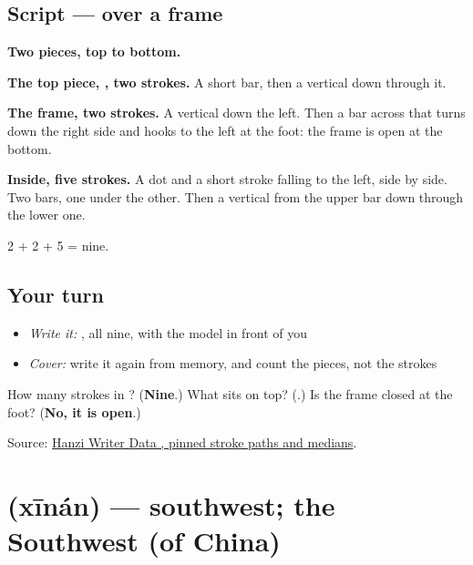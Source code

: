 \subsection*{Script —  over a frame}

\begin{quote}
\end{quote}

\textbf{Two pieces, top to bottom.}

\textbf{The top piece, , two strokes.} A short bar, then a vertical down through it.

\textbf{The frame, two strokes.} A vertical down the left. Then a bar across that turns down the right side and hooks to the left at the foot: the frame is open at the bottom.

\textbf{Inside, five strokes.} A dot and a short stroke falling to the left, side by side. Two bars, one under the other. Then a vertical from the upper bar down through the lower one.

2 + 2 + 5 = nine.

\subsection*{Your turn}
\begin{itemize}
\raggedright
  \item \emph{Write it:} , all nine, with the model in front of you
  \item \emph{Cover:} write it again from memory, and count the pieces, not the strokes
\end{itemize}

\begin{tcolorbox}[breakable,colback=teal!4,colframe=teal!35!black,title={Before you move on}]
How many strokes in ? (\textbf{Nine}.) What sits on top? (\textbf{}.) Is the frame closed at the foot? (\textbf{No, it is open}.)

Source: \href{https://raw.githubusercontent.com/chanind/hanzi-writer-data/68d10a4b21150cae5e1ebbd223eed289cf32d90c/data/\%E5\%8D\%97.json}{Hanzi Writer Data , pinned stroke paths and medians}.
\end{tcolorbox}
\section[\texorpdfstring{\zh{西南} (xīnán)}{西南 (xīnán)}]{ (xīnán) — southwest; the Southwest (of China)}

